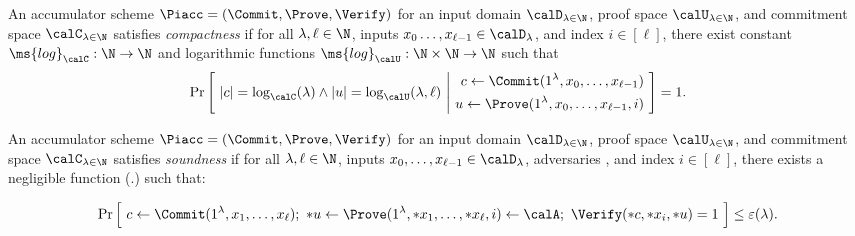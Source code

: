 \newcommand{\polylog}{\ms{polylog}}
\newcommand{\len}{\ms{len}}
\newcommand{\logg}{{\ms{log}}}

\begin{definition}[Compactness]
    \label{def:compactness}
    An accumulator scheme $\Piacc = (\Commit, \Prove, \Verify)$ for an input
    domain $\calD_{\lambda \in \N}$, proof space $\calU_{\lambda \in \N}$, and
    commitment space $\calC_{\lambda \in \N}$ satisfies \emph{compactness}
    if for all $\lambda, \ell \in \N$, inputs $x_0 \ldots, x_{\ell-1} \in
    \calD_\lambda$, and index $i \in [\ell]$, there exist constant $\logg_\calC:
    \N \to \N$ and logarithmic functions $\logg_{\calU}: \N \times \N \to \N$
    such that
    \[ \Pr \left[~ |c| = \log_\calC(\lambda) \land |u| = \log_\calU(\lambda,
        \ell) ~\Bigg|~ \begin{aligned} c \gets \Commit(1^\lambda, x_0, \ldots,
        x_{\ell-1}) \\ u \gets \Prove(1^\lambda, x_0, \ldots, x_{\ell-1}, i) 
        \end{aligned} ~\right] = 1 .\]
\end{definition}

\begin{definition}[Soundness]
    \label{def:soundness}
    An accumulator scheme $\Piacc = (\Commit, \Prove, \Verify)$ for an input
    domain $\calD_{\lambda \in \N}$, proof space $\calU_{\lambda \in \N}$, and
    commitment space $\calC_{\lambda \in \N}$ satisfies \emph{soundness} if
    for all $\lambda, \ell \in \N$, inputs $x_0, \ldots, x_{\ell-1} \in
    \calD_\lambda$, adversaries \calA, and index $i \in [\ell]$, there exists 
    a negligible function \varepsilon(.) such that:

    \[ \Pr \Big[~ c \gets \Commit(1^\lambda, x_1, \ldots, x_\ell) ;~ *u \gets
        \Prove(1^\lambda, *x_1, \ldots, *x_\ell, i) \gets \calA;~ \Verify(*c, *x_i, *u) = 1
        ~\Big] \leq \varepsilon(\lambda) .\]
\end{definition}

